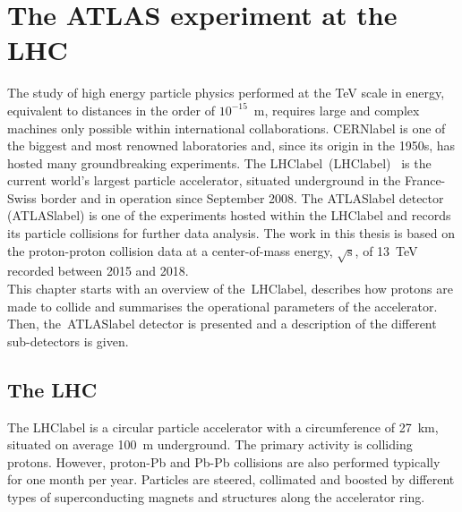 \chapter{The ATLAS experiment at the LHC}
\label{chapter:ATLASLHC}

The study of high energy particle physics performed at the TeV scale in energy, equivalent to distances in the order of $10^{-15}$~m, requires large and complex machines only possible within international collaborations. \acrshort{CERNlabel} is one of the biggest and most renowned laboratories and, since its origin in the 1950s, has hosted many groundbreaking experiments. The \acrlong{LHClabel}~(\acrshort{LHClabel})~\cite{LHCmachine} is the current world's largest particle accelerator, situated underground in the France-Swiss border and in operation since September 2008. The \acrshort{ATLASlabel} detector~\cite{ATLASmachine} (\acrlong{ATLASlabel}) is one of the experiments hosted within the \acrshort{LHClabel} and records its particle collisions for further data analysis. The work in this thesis is based on the proton-proton collision data at a center-of-mass energy, $\sqrt{\text{s}}$, of 13~TeV recorded between 2015 and 2018.\\

This chapter starts with an overview of the~\acrshort{LHClabel}, describes how protons are made to collide and summarises the operational parameters of the accelerator. Then, the~\acrshort{ATLASlabel} detector is presented and a description of the different sub-detectors is given.

\section{The LHC}

The \acrshort{LHClabel} is a circular particle accelerator with a circumference of 27~km, situated on average 100~m underground. The primary activity is colliding protons. However, proton-Pb and Pb-Pb collisions are also performed typically for one month per year. Particles are steered, collimated and boosted by different types of superconducting magnets and structures along the accelerator ring.\\

